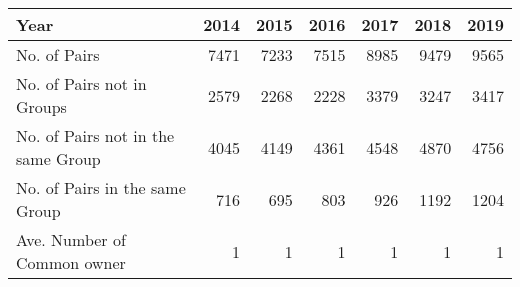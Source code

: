 \begin{tabular}{lrrrrrr}
\toprule
Year &  2014 &  2015 &  2016 &  2017 &  2018 &  2019 \\
\midrule
No. of Pairs                       &  7471 &  7233 &  7515 &  8985 &  9479 &  9565 \\
No. of Pairs not in Groups         &  2579 &  2268 &  2228 &  3379 &  3247 &  3417 \\
No. of Pairs not in the same Group &  4045 &  4149 &  4361 &  4548 &  4870 &  4756 \\
No. of Pairs in the same Group     &   716 &   695 &   803 &   926 &  1192 &  1204 \\
Ave. Number of Common owner        &     1 &     1 &     1 &     1 &     1 &     1 \\
\bottomrule
\end{tabular}
